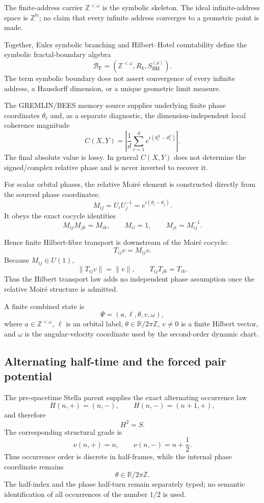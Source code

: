 \documentclass[11pt]{article}
\begin{document}
The finite-address carrier \(\mathbb Z^{<\omega}\) is the symbolic
skeleton. The ideal infinite-address space is \(\mathbb Z^{\mathbb N}\);
no claim that every infinite address converges to a geometric point is made.

Together, Euler symbolic branching and Hilbert--Hotel countability define the
symbolic fractal-boundary algebra
\[
\boxed{
\mathcal B_{\mathrm F}
=
\left(
\mathbb Z^{<\omega},
R_k,
S_{\mathrm{HH}}^{(\rho)}
\right).
}
\]
The term symbolic boundary does not assert convergence of every infinite
address, a Hausdorff dimension, or a unique geometric limit measure.

The GREMLIN/BEES memory source supplies underlying finite phase coordinates
\(\theta_r\) and, as a separate diagnostic, the dimension-independent local
coherence magnitude
\[
\boxed{
C(X,Y)
=
\left|
\frac1d
\sum_{r=1}^{d}
e^{i(\theta_r^X-\theta_r^Y)}
\right|.
}
\]
The final absolute value is lossy. In general \(C(X,Y)\) does not determine
the signed/complex relative phase and is never inverted to recover it.

For scalar orbital phases, the relative Moir\'e element is constructed
directly from the sourced phase coordinates:
\[
M_{ij}=U_iU_j^{-1}=e^{i(\theta_i-\theta_j)}.
\]
It obeys the exact cocycle identities
\[
\boxed{
M_{ij}M_{jk}=M_{ik},
\qquad
M_{ii}=1,
\qquad
M_{ji}=M_{ij}^{-1}.
}
\]

Hence finite Hilbert-fibre transport is downstream of the Moir\'e cocycle:
\[
\boxed{
T_{ij}v=M_{ij}v.
}
\]
Because \(M_{ij}\in U(1)\),
\[
\|T_{ij}v\|=\|v\|,
\qquad
T_{ij}T_{jk}=T_{ik}.
\]
Thus the Hilbert transport law adds no independent phase assumption once the
relative Moir\'e structure is admitted.

A finite combined state is
\[
\boxed{
\Psi=(a,\ell,\theta,v,\omega),
}
\]
where \(a\in\mathbb Z^{<\omega}\), \(\ell\) is an orbital label,
\(\theta\in\mathbb R/2\pi\mathbb Z\), \(v\neq0\) is a finite Hilbert vector,
and \(\omega\) is the angular-velocity coordinate used by the second-order
dynamic chart.

\subsection{Alternating half-time and the forced pair potential}

The pre-spacetime Stella parent supplies the exact alternating occurrence law
\cite{LipaTIRHalfTime2026}
\[
H(n,+)=(n,-),
\qquad
H(n,-)=(n+1,+),
\]
and therefore
\[
\boxed{H^2=S.}
\]
The corresponding structural grade is
\[
\nu(n,+)=n,
\qquad
\nu(n,-)=n+\frac12.
\]
Thus occurrence order is discrete in half-frames, while the internal phase
coordinate remains
\[
\theta\in\mathbb R/2\pi\mathbb Z.
\]
The half-index and the phase half-turn remain separately typed; no semantic
identification of all occurrences of the number \(1/2\) is used.
\end{document}
